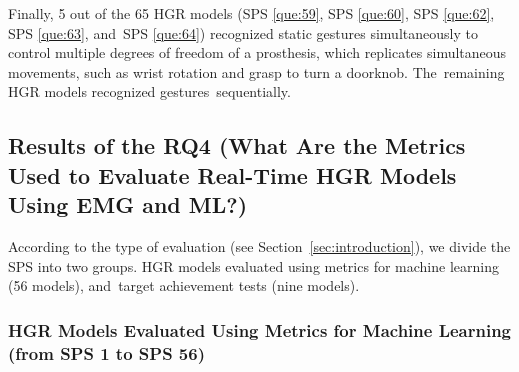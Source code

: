 \documentclass[sensors,review,accept,moreauthors,pdftex]{Definitions/mdpi}
\begin{document}
Finally, 5 out of the 65 HGR models (SPS \ref{que:59}, SPS \ref{que:60}, SPS \ref{que:62}, SPS \ref{que:63}, and~SPS \ref{que:64}) recognized static gestures simultaneously to control multiple degrees of freedom of a prosthesis, which replicates simultaneous movements, such as wrist rotation and grasp to turn a doorknob. The~remaining HGR models recognized gestures~sequentially. 



\subsection{Results of the RQ4 (What Are the Metrics Used to Evaluate Real-Time HGR Models Using EMG and ML?)} \label{metric}

According to the type of evaluation (see Section~\ref{sec:introduction}), we divide the SPS into two groups. HGR models evaluated using metrics for machine learning (56 models), and~target achievement tests (nine models).

\subsubsection{HGR Models Evaluated Using Metrics for Machine Learning (from SPS 1 to SPS 56)}
\end{document}
